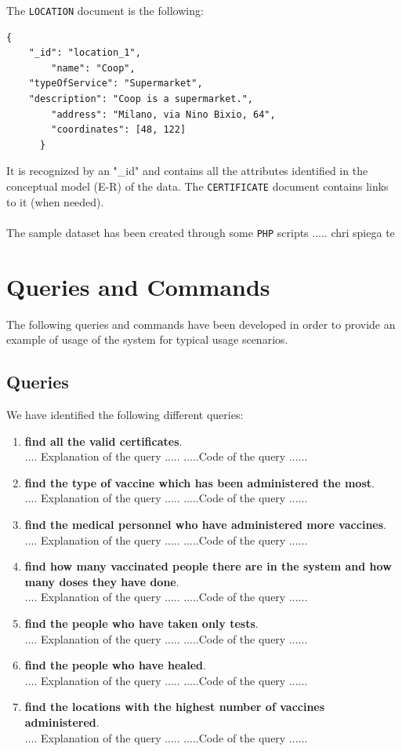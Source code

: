 \documentclass{article}
\begin{document}
\vspace{0.3cm}
The \verb|LOCATION| document is the following:
\begin{verbatim}
{
	"_id": "location_1",
        "name": "Coop",
	"typeOfService": "Supermarket",
	"description": "Coop is a supermarket.",
        "address": "Milano, via Nino Bixio, 64",
        "coordinates": [48, 122]
      }
\end{verbatim}
It is recognized by an "\_id" and contains all the attributes identified in the conceptual model (E-R) of the data. The \verb|CERTIFICATE| document contains links to it (when needed).\\ \\
\vspace{1cm}
The sample dataset has been created through some \verb|PHP| scripts ..... 
chri spiega te
\section{Queries and Commands}
The following queries and commands have been developed in order to provide an example of usage of the system for typical usage scenarios.
\subsection{Queries}
We have identified the following different queries:
\begin{enumerate}
    \item \textbf{find all the  valid certificates}.\\ .... Explanation of the query .....
    .....Code of the query ......
    \item \textbf{find the type of vaccine which has been administered the most}.\\ .... Explanation of the query .....
    .....Code of the query ......
    \item \textbf{find the medical personnel who have administered more vaccines}.\\ .... Explanation of the query .....
    .....Code of the query ......
    \item \textbf{find how many vaccinated people there are in the system and how many doses they have done}.\\ .... Explanation of the query .....
    .....Code of the query ......
    \item \textbf{find the people who have taken only tests}.\\ .... Explanation of the query .....
    .....Code of the query ......
    \item \textbf{find the people who have healed}.\\ .... Explanation of the query .....
    .....Code of the query ......
    \item \textbf{find the locations with the highest number of vaccines administered}.\\ .... Explanation of the query .....
    .....Code of the query ......
    \end{enumerate}
\end{document}

